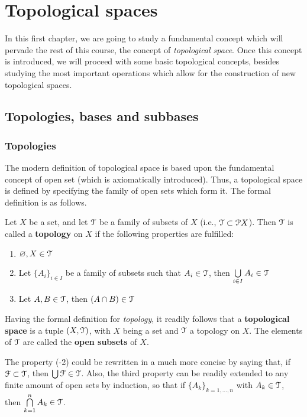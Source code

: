 \chapter{Topological spaces}\label{ch:topological-spaces}

In this first chapter, we are going to study a fundamental concept which will pervade
the rest of this course, the concept of \emph{topological space}.
Once this concept is introduced, we will proceed with some basic topological concepts,
besides studying the most important operations which allow for the construction of new
topological spaces.

\section{Topologies, bases and subbases}
\label{sec:topologies,-bases-and-subbases}

\subsection{Topologies}
\label{subsec:topologies}

The modern definition of topological space is based upon the fundamental concept of
open  set (which is axiomatically introduced).
Thus, a topological space is defined by specifying the family of open sets which form it.
The formal definition is as follows.

\begin{definition}
	\label{def:topology}
	Let $X$ be a set, and let $\EuScript{T}$ be a family of subsets of $X$ (i.e., $\EuScript{T}\subset\EuScript{P} X$).
	Then $\EuScript{T}$ is called a \textbf{topology} on $X$ if the following properties are
	fulfilled:
	\begin{enumerate}
		\item $\varnothing, X\in \EuScript{T}$
		\item Let $\{A_i\}_{i\in I}$ be a family of subsets such that $A_i \in \EuScript{T}$,
		then $\bigcup\limits_{i\in I} A_i\in\EuScript{T}$
		\item Let $A, B\in \EuScript{T}$, then $(A\cap B)\in \EuScript{T}$
	\end{enumerate}
\end{definition}

Having the formal definition for \emph{topology}, it readily follows that a
\textbf{topological space} is a tuple $(X, \EuScript{T})$, with $X$ being a set and $\EuScript{T}$ a
topology on $X$.
The elements of $\EuScript{T}$ are called the \textbf{open subsets} of $X$.

\begin{remark}
	The property (-2) could be rewritten in a much more concise by
	saying that, if $\EuScript{F}\subset\EuScript{T}$, then $\bigcup\EuScript{F}\in\EuScript{T}$.
	Also, the third property can be readily extended to any finite amount of open sets
	by induction, so that if $\{A_k\}_{k=1,\dots,n}$ with $A_k\in\EuScript{T}$, then
	$\bigcap\limits_{k=1}^n A_k\in \EuScript{T}$.
\end{remark}

